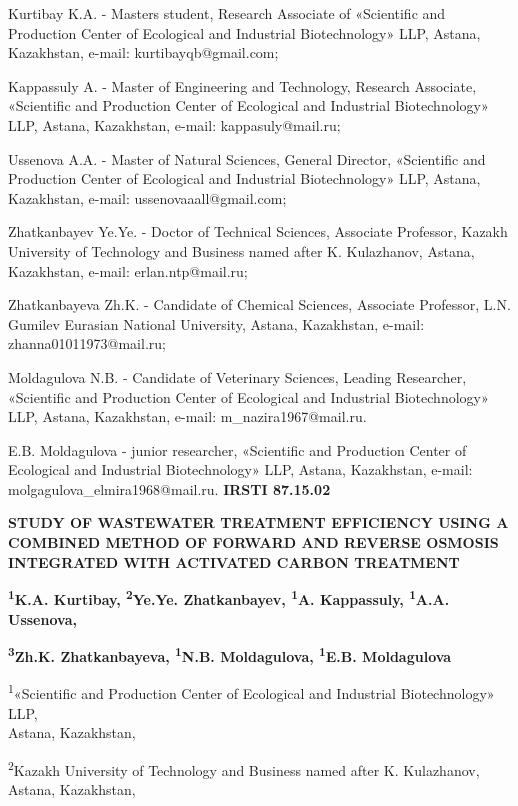 Kurtibay K.A. - Master\textquotesingle s student, Research Associate of
«Scientific and Production Center of Ecological and Industrial
Biotechnology» LLP, Astana, Kazakhstan, e-mail: kurtibayqb@gmail.com;

Kappassuly A. - Master of Engineering and Technology, Research
Associate, «Scientific and Production Center of Ecological and
Industrial Biotechnology» LLP, Astana, Kazakhstan, e-mail:
kappasuly@mail.ru;

Ussenova A.A. - Master of Natural Sciences, General Director,
«Scientific and Production Center of Ecological and Industrial
Biotechnology» LLP, Astana, Kazakhstan, e-mail: ussenovaaall@gmail.com;

Zhatkanbayev Ye.Ye. - Doctor of Technical Sciences, Associate Professor,
Kazakh University of Technology and Business named after K. Kulazhanov,
Astana, Kazakhstan, e-mail: erlan.ntp@mail.ru;

Zhatkanbayeva Zh.K. - Candidate of Chemical Sciences, Associate
Professor, L.N. Gumilev Eurasian National University, Astana,
Kazakhstan, e-mail: zhanna01011973@mail.ru;

Moldagulova N.B. - Candidate of Veterinary Sciences, Leading Researcher,
«Scientific and Production Center of Ecological and Industrial
Biotechnology» LLP, Astana, Kazakhstan, e-mail: m\_nazira1967@mail.ru.

E.B. Moldagulova - junior researcher, «Scientific and Production Center
of Ecological and Industrial Biotechnology» LLP, Astana, Kazakhstan,
e-mail: molgagulova\_elmira1968@mail.ru.\newpage
{\bfseries IRSTI 87.15.02}

{\bfseries STUDY OF WASTEWATER TREATMENT EFFICIENCY USING A COMBINED METHOD
OF FORWARD AND REVERSE OSMOSIS INTEGRATED WITH ACTIVATED CARBON
TREATMENT}

{\bfseries \textsuperscript{1}K.A. Kurtibay, \textsuperscript{2}Ye.Ye.
Zhatkanbayev, \textsuperscript{1}A. Kappassuly, \textsuperscript{1}A.A.
Ussenova,}

{\bfseries \textsuperscript{3}Zh.K. Zhatkanbayeva, \textsuperscript{1}N.B.
Moldagulova, \textsuperscript{1}E.B. Moldagulova}

\textsuperscript{1}«Scientific and Production Center of Ecological and
Industrial Biotechnology» LLP,\\
Astana, Kazakhstan,

\textsuperscript{2}Kazakh University of Technology and Business named
after K. Kulazhanov,\\
Astana, Kazakhstan,

